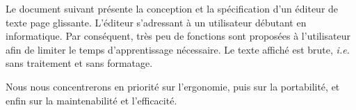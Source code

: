 Le document suivant présente la conception et la spécification d'un éditeur de texte page glissante. L'éditeur s'adressant à un utilisateur débutant en informatique. Par conséquent, très peu de fonctions sont proposées à l'utilisateur afin de limiter le temps d'apprentissage nécessaire. Le texte affiché est brute, \textsl{i.e.} sans traitement et sans formatage.

Nous nous concentrerons en priorité sur l'ergonomie, puis sur la portabilité, et enfin sur la maintenabilité et l'efficacité.
